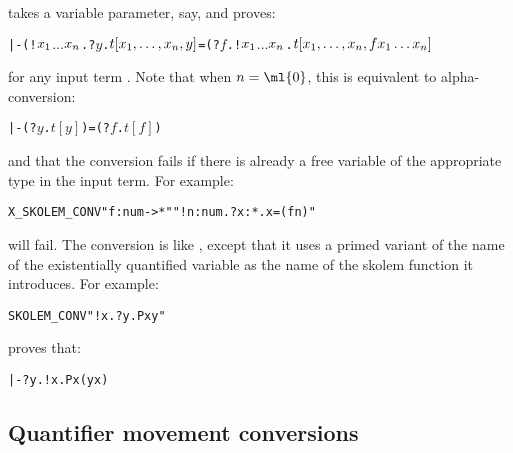 \noindent takes a variable parameter,  say, and
proves:

\begin{hol}\begin{alltt}
   |- (!\(x\sb{1}\) \(\ldots\) \(x\sb{n}\). ?\(y\). \(t[x\sb{1},\ldots,x\sb{n},y]\)  =  (?\(f\). !\(x\sb{1}\) \(\ldots\) \(x\sb{n}\). \(t[x\sb{1},\ldots,x\sb{n},f x\sb{1}\ldots x\sb{n}]\)
\end{alltt}\end{hol}

\noindent for any input term 
.  
Note that when $n=\ml{0}$, this
is equivalent to alpha-conversion:

\begin{hol}\begin{alltt}
  |- (?\(y\). \(t[y]\)) = (?\(f\). \(t[f]\))
\end{alltt}\end{hol}

\noindent and that the conversion fails if there is already a free 
variable  of the appropriate type in the input term. For example:

\begin{hol}\begin{alltt}
  X_SKOLEM_CONV "f:num->*" "!n:num. ?x:*. x = (f n)"
\end{alltt}\end{hol}

\noindent will fail.  The conversion  is 
like , except that it
uses a primed variant of the name of the existentially quantified variable
as the name of the skolem function it introduces.  For example:

\begin{hol}\begin{alltt}
  SKOLEM_CONV "!x. ?y. P x y"
\end{alltt}\end{hol}

\noindent proves that:

\begin{hol}\begin{alltt}
  |- ?y. !x. P x (y x)
\end{alltt}\end{hol}


\subsection{Quantifier movement conversions}

